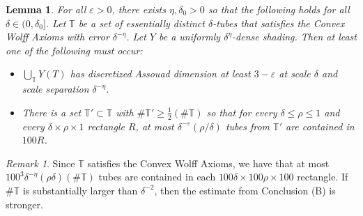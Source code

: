 \documentclass[letterpaper, reqno,11pt]{article}
\numberwithin{equation}{section}
\newcommand{\eps}{\varepsilon}
\newcommand{\tubes}{\mathbb{T}}
\numberwithin{thm}{section}
\newtheorem{lem}[thm]{Lemma}
\theoremstyle{remark}
\newtheorem{rem}[thm]{Remark}
\begin{document}
\begin{lem}\label{convexWolffImpliesFewTubesInRectangleLem}
For all $\eps>0$, there exists $\eta,\delta_0>0$ so that the following holds for all $\delta\in(0,\delta_0]$. Let $\tubes$ be a set of essentially distinct $\delta$-tubes that satisfies the Convex Wolff Axioms with error $\delta^{-\eta}$. Let $Y$ be a uniformly $\delta^\eta$-dense shading. Then at least one of the following must occur:
\begin{itemize}
	\item[(A)] $\bigcup_{\tubes} Y(T)$ has discretized Assouad dimension at least $3-\eps$ at scale $\delta$ and scale separation $\delta^{-\eta}$. 

	\item[(B)] There is a set $\tubes'\subset\tubes$ with $\#\tubes'\geq\frac{1}{2}(\#\tubes)$ so that for every $\delta\leq\rho\leq 1$ and every $\delta\times\rho\times 1$ rectangle $R$, at most $\delta^{-\eps}(\rho/\delta)$ tubes from $\tubes'$ are contained in $100R$. 
\end{itemize}
\end{lem}
\begin{rem}
Since $\tubes$ satisfies the Convex Wolff Axioms, we have that at most $100^3\delta^{-\eta}(\rho\delta)(\#\tubes)$ tubes are contained in each $100\delta\times 100\rho\times 100$ rectangle. If $\#\tubes$ is substantially larger than $\delta^{-2}$, then the estimate from Conclusion (B) is stronger. 
\end{rem}
\end{document}
